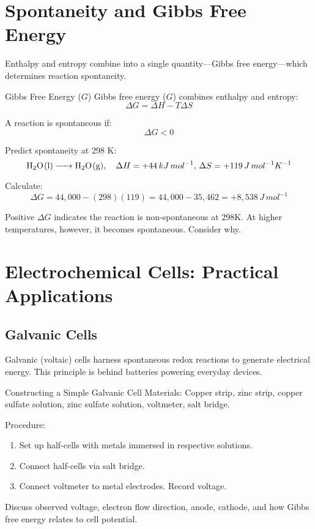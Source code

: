 \section{Spontaneity and Gibbs Free Energy}
\FloatBarrier
\FloatBarrier
\FloatBarrier

Enthalpy and entropy combine into a single quantity—Gibbs free energy—which determines reaction spontaneity.

\begin{keyconcept}{Gibbs Free Energy (\(G\))}
Gibbs free energy (\(G\)) combines enthalpy and entropy:
\[
\Delta G = \Delta H - T\Delta S
\]

A reaction is spontaneous if:
\[
\Delta G < 0
\]
\end{keyconcept}


\begin{example}
Predict spontaneity at 298 K:
\[
\ce{H2O(l) -> H2O(g)}, \quad \Delta H=+44\,kJ\,mol^{-1},\,\Delta S=+119\,J\,mol^{-1}K^{-1}
\]

Calculate:
\[
\Delta G = 44,000 - (298)(119) = 44,000 - 35,462 = +8,538\,J\,mol^{-1}
\]

Positive \(\Delta G\) indicates the reaction is non-spontaneous at 298K. At higher temperatures, however, it becomes spontaneous. Consider why.
\end{example}

\section{Electrochemical Cells: Practical Applications}
\FloatBarrier
\FloatBarrier
\FloatBarrier

\subsection{Galvanic Cells}
\FloatBarrier
\FloatBarrier
\FloatBarrier

Galvanic (voltaic) cells harness spontaneous redox reactions to generate electrical energy. This principle is behind batteries powering everyday devices.

\begin{investigation}{Constructing a Simple Galvanic Cell}
Materials: Copper strip, zinc strip, copper sulfate solution, zinc sulfate solution, voltmeter, salt bridge.

Procedure:
\begin{enumerate}
    \item Set up half-cells with metals immersed in respective solutions.
    \item Connect half-cells via salt bridge.
    \item Connect voltmeter to metal electrodes. Record voltage.
\end{enumerate}

Discuss observed voltage, electron flow direction, anode, cathode, and how Gibbs free energy relates to cell potential.
\end{investigation}

